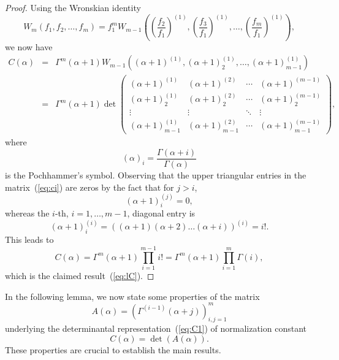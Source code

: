 \documentclass[pdflatex,sn-mathphys-num]{sn-jnl}%
\theoremstyle{thmstyleone}
\begin{document}
\begin{proof}
Using the Wronskian identity~\cite[Eq.(2.5)]{Karlin}
\begin{equation}
W_{m}\left(f_{1},f_{2},\dots,f_{m}\right)=f_{1}^{m}W_{m-1}\left(\left(\frac{f_{2}}{f_{1}}\right)^{(1)},\left(\frac{f_{3}}{f_{1}}\right)^{(1)},\dots,\left(\frac{f_{m}}{f_{1}}\right)^{(1)}\right),
\end{equation}
we now have
\begin{eqnarray}
C(\alpha) &=& \Gamma^{m}(\alpha+1)W_{m-1}\left((\alpha+1)^{(1)},(\alpha+1)^{(1)}_{2},\dots,(\alpha+1)^{(1)}_{m-1}\right) \\
&=& \Gamma^{m}(\alpha+1)\det
\begin{pmatrix}
(\alpha+1)^{(1)} & (\alpha+1)^{(2)} & \cdots & (\alpha+1)^{(m-1)} \\
(\alpha+1)^{(1)}_{2} & (\alpha+1)^{(2)}_{2} & \cdots & (\alpha+1)^{(m-1)}_{2} \\
\vdots & \vdots & \ddots & \vdots \\
(\alpha+1)^{(1)}_{m-1} & (\alpha+1)^{(2)}_{m-1} & \cdots & (\alpha+1)^{(m-1)}_{m-1}
\end{pmatrix},\label{eq:ci}	
\end{eqnarray}
where
\begin{equation}
(\alpha)_{i}=\frac{\Gamma(\alpha+i)}{\Gamma(\alpha)}
\end{equation}
is the Pochhammer's symbol. Observing that the upper triangular entries in the matrix~(\ref{eq:ci}) are zeros by the fact that for $j>i$,
\begin{equation}
(\alpha+1)^{(j)}_{i}=0,
\end{equation}
whereas the $i$-th, $i=1,\dots,m-1$, diagonal entry is
\begin{equation}
(\alpha+1)_{i}^{(i)}=\left((\alpha+1)(\alpha+2)\dots(\alpha+i)\right)^{(i)}=i!.
\end{equation}
This leads to
\begin{equation}
C(\alpha)=\Gamma^{m}(\alpha+1)\prod_{i=1}^{m-1}i!=\Gamma^{m}(\alpha+1)\prod_{i=1}^{m}\Gamma(i),
\end{equation}
which is the claimed result~(\ref{eq:lC}).
\end{proof}

In the following lemma, we now state some properties of the matrix
\begin{equation}\label{eq:A}
A(\alpha)=\left(\Gamma^{(i-1)}(\alpha+j)\right)_{i,j=1}^{m}
\end{equation}
underlying the determinantal representation~(\ref{eq:C1}) of normalization constant
\begin{equation}\label{eq:C1r}
C(\alpha)=\det\left(A(\alpha)\right).
\end{equation}
These properties are crucial to establish the main results.
\end{document}
